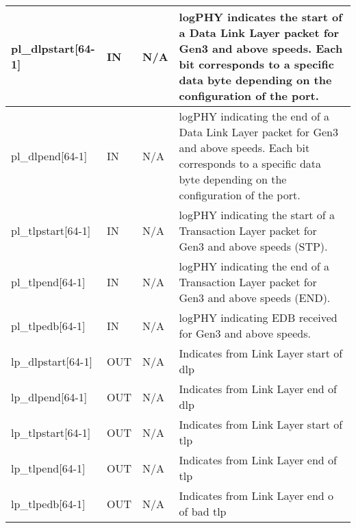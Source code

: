 \begin{table}[H]

    \centering
  \begin{tabular}{ |m{26mm}|P{10mm}|P{18mm}|m{60mm}|  }
  \hline

pl\_dlpstart[64-1] & IN &N/A & logPHY indicates the start of a Data Link Layer packet for Gen3 and above speeds. Each
bit corresponds to a specific data byte depending on the configuration of the port.\\ \hline 
pl\_dlpend[64-1]& IN &N/A & logPHY indicating the end of a Data Link Layer packet for Gen3 and above speeds. Each
bit corresponds to a specific data byte depending on the configuration of the port.\\ \hline
pl\_tlpstart[64-1]& IN &N/A &logPHY indicating the start of a Transaction Layer packet for Gen3 and above speeds
(STP). \\ \hline
pl\_tlpend[64-1]& IN &N/A & logPHY indicating the end of a Transaction Layer packet for Gen3 and above speeds
(END).\\ \hline
pl\_tlpedb[64-1]& IN &N/A & logPHY indicating EDB received for Gen3 and above speeds. \\ \hline

lp\_dlpstart[64-1] & OUT &N/A & 
Indicates from Link Layer start of dlp\\ \hline 
lp\_dlpend[64-1]& OUT &N/A & 
Indicates from Link Layer end of dlp\\ \hline
lp\_tlpstart[64-1]& OUT &N/A &
Indicates from Link Layer start of tlp \\ \hline
lp\_tlpend[64-1]& OUT &N/A & 
Indicates from Link Layer end of tlp\\ \hline
lp\_tlpedb[64-1]& OUT &N/A & 
Indicates from Link Layer end o of bad tlp\\ \hline

\end{tabular}
\end{table}


